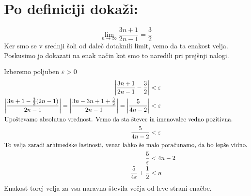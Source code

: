 \documentclass[a4paper, 12pt]{article}
\begin{document}
    \section{Po definiciji dokaži:}
    \[
    \lim_{n \to \infty} \frac{3n + 1} {2n-1} = \frac{3}{2}
    \]
    Ker smo se v srednji šoli od daleč dotaknili limit, vemo da ta enakost velja. Poskusimo jo dokazati na enak način kot smo to naredili pri prejšnji nalogi.
    
    Izberemo poljuben $\varepsilon > 0$
    \begin{align*}
        \left|  \frac{3n + 1} {2n-1} - \frac{3}{2} \right| &< \varepsilon \\
        \left|  \frac{3n + 1- \frac{3}{2}(2n-1)} {2n-1}\right| = 
        \left|  \frac{3n - 3n + 1 + \frac{3}{2}} {2n-1} \right| = 
        \left|  \frac{5} {4n-2} \right| &< \varepsilon \\
        \intertext{Upoštevamo absolutno vrednost. Vemo da sta števec in imenovalec vedno pozitivna.}
        \frac{5} {4n-2} &< \varepsilon \\
        \intertext{To velja zaradi arhimedske lastnosti, venar lahko še malo poračunamo, da bo lepše vidno.}
        \frac{5} {\varepsilon} &< 4n - 2 \\
        \frac{5} {4\varepsilon} + \frac{1}{2} &< n
    \end{align*}
    Enakost torej velja za vsa naravna števila večja od leve strani enačbe.
    
\end{document}
